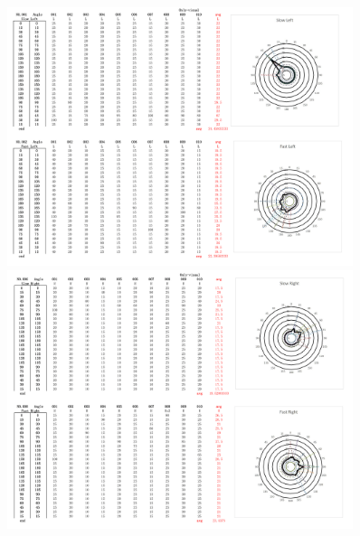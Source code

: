 \begin{figure}[h]
\centering
\includegraphics[width=0.9\textwidth,height=0.36\textheight]{A_thesis/appendix/Exp1_1-03.png}
\break
\break
\includegraphics[width=0.9\textwidth,height=0.36\textheight]{A_thesis/appendix/Exp1_1-04.png}
\end{figure}
\newpage

